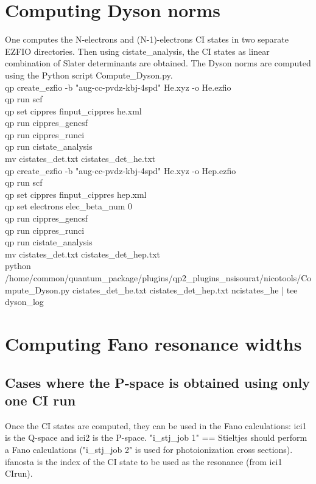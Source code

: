 \documentclass[a4paper, 10 pt]{report}
\begin{document}
\section{Computing Dyson norms}

One computes the N-electrons and (N-1)-electrons CI states in two separate EZFIO directories. Then using cistate\_analysis, the CI states as linear combination of Slater determinants are obtained. The Dyson norms are computed using the Python script Compute\_Dyson.py.\\

\noindent qp create\_ezfio -b "aug-cc-pvdz-kbj-4spd" He.xyz -o He.ezfio\\
qp run scf\\
qp set cippres finput\_cippres he.xml\\
qp run cippres\_gencsf\\
qp run cippres\_runci\\
qp run cistate\_analysis\\
mv cistates\_det.txt cistates\_det\_he.txt\\
qp create\_ezfio -b "aug-cc-pvdz-kbj-4spd" He.xyz -o Hep.ezfio\\
qp run scf\\
qp set cippres finput\_cippres hep.xml\\
qp set electrons elec\_beta\_num 0\\
qp run cippres\_gencsf\\
qp run cippres\_runci\\
qp run cistate\_analysis\\
mv cistates\_det.txt cistates\_det\_hep.txt\\
python /home/common/quantum\_package/plugins/qp2\_plugins\_nsisourat/nicotools/Compute\_Dyson.py cistates\_det\_he.txt cistates\_det\_hep.txt ncistates\_he | tee dyson\_log\\

\section{Computing Fano resonance widths}

\subsection{Cases where the P-space is obtained using only one CI run}

Once the CI states are computed, they can be used in the Fano calculations: ici1 is the Q-space and ici2 is the P-space.  "i\_stj\_job 1" == Stieltjes should perform a Fano calculations ("i\_stj\_job 2" is used for photoionization cross sections). ifanosta is the index of the CI state to be used as the resonance (from ici1 CIrun).\\
\end{document}

